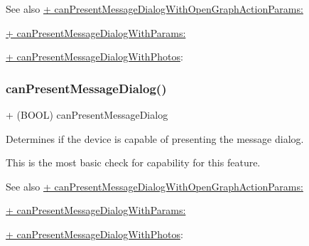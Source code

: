 \begin{DoxySeeAlso}{See also}
\hyperlink{interfaceFBDialogs_abc596dd117701ceb160dd63db514cf11}{+ can\+Present\+Message\+Dialog\+With\+Open\+Graph\+Action\+Params\+:} 

\hyperlink{interfaceFBDialogs_a81544299ca98179464ec34fc0e8d12b7}{+ can\+Present\+Message\+Dialog\+With\+Params\+:} 

\hyperlink{interfaceFBDialogs_ac10e310c30d763c7885c11fb44ac4924}{+ can\+Present\+Message\+Dialog\+With\+Photos}\+: 
\end{DoxySeeAlso}
\mbox{\label{interfaceFBDialogs_aa41db27dd00b0c59e01d45f72b9045aa}} 
\subsubsection{\texorpdfstring{can\+Present\+Message\+Dialog()}{canPresentMessageDialog()}\hspace{0.1cm}{\footnotesize\ttfamily [4/5]}}
{\footnotesize\ttfamily + (B\+O\+OL) can\+Present\+Message\+Dialog \begin{DoxyParamCaption}{ }\end{DoxyParamCaption}}

Determines if the device is capable of presenting the message dialog.

This is the most basic check for capability for this feature.

\begin{DoxySeeAlso}{See also}
\hyperlink{interfaceFBDialogs_abc596dd117701ceb160dd63db514cf11}{+ can\+Present\+Message\+Dialog\+With\+Open\+Graph\+Action\+Params\+:} 

\hyperlink{interfaceFBDialogs_a81544299ca98179464ec34fc0e8d12b7}{+ can\+Present\+Message\+Dialog\+With\+Params\+:} 

\hyperlink{interfaceFBDialogs_ac10e310c30d763c7885c11fb44ac4924}{+ can\+Present\+Message\+Dialog\+With\+Photos}\+: 
\end{DoxySeeAlso}
\mbox{\label{interfaceFBDialogs_aa41db27dd00b0c59e01d45f72b9045aa}} 
